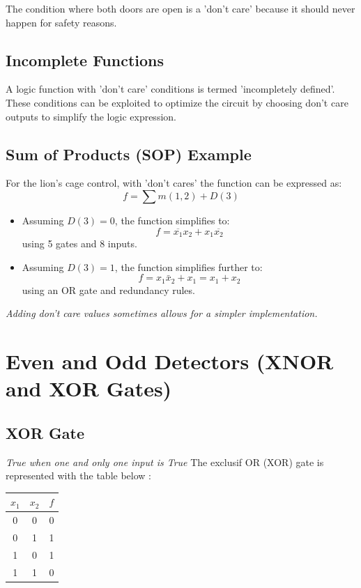 \documentclass[12pt,openany, tikz,border=10pt]{book}
\begin{document}
			      	The condition where both doors are open is a 'don't care' because it should never happen for safety reasons.
			      	
			      	\subsection{Incomplete Functions}
			      	A logic function with 'don't care' conditions is termed 'incompletely defined'. These conditions can be exploited to optimize the circuit by choosing don't care outputs to simplify the logic expression.
			      	
			      	\subsection{Sum of Products (SOP) Example}
			      	For the lion's cage control, with 'don't cares' the function can be expressed as:
			      	\[ f = \sum m(1,2) + D(3) \]
			      	
			      	\begin{itemize}
			      		\item Assuming \( D(3) = 0 \), the function simplifies to:
			      		      \[ f = \overline{x_1} x_2 + x_1 \overline{x_2} \]
			      		      using 5 gates and 8 inputs.
			      		\item Assuming \( D(3) = 1 \), the function simplifies further to:
			      		      \[ f = x_1 \bar{x}_2 + x_1 = x_1 + x_2 \]
			      		      using an OR gate and redundancy rules.
			      	\end{itemize}
			      	
			      	\textit{Adding don't care values sometimes allows for a simpler implementation.}
			      	\section{Even and Odd Detectors (XNOR and XOR Gates)}
			      	\subsection{XOR Gate}
			      	\textit{True when one and only one input is True}
			      	The exclusif OR (XOR) gate is represented with the table below :
			      	\begin{table}[h]
			      		\centering
			      		\begin{tabular}{|c|c|c|}
			      			\hline
			      			\( x_1 \) & \( x_2 \) & \( f \) \\
			      			\hline
			      			0         & 0         & 0       \\
			      			0         & 1         & 1       \\
			      			1         & 0         & 1       \\
			      			1         & 1         & 0       \\
			      			\hline
			      		\end{tabular}
			      	\end{table}
			      	
\end{document}
